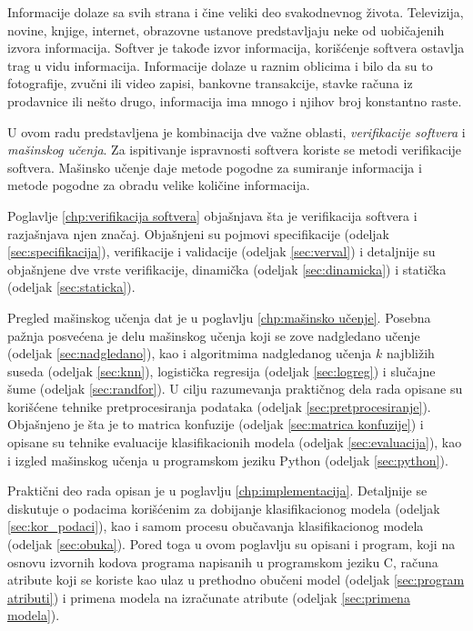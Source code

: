 \documentclass[12pt,oneside]{memoir}
\begin{document}
Informacije dolaze sa svih strana i čine veliki deo svakodnevnog života. Televizija, novine, knjige, internet, obrazovne ustanove predstavljaju neke od uobičajenih izvora informacija. Softver je takođe izvor informacija, korišćenje softvera ostavlja trag u vidu informacija. Informacije dolaze u raznim oblicima i bilo da su to fotografije, zvučni ili video zapisi, bankovne transakcije, stavke računa iz prodavnice ili nešto drugo, informacija ima mnogo i njihov broj konstantno raste. 

U ovom radu predstavljena je kombinacija dve važne oblasti, \textit{verifikacije softvera} i \textit{mašinskog učenja}. Za ispitivanje ispravnosti softvera koriste se metodi verifikacije softvera. Mašinsko učenje daje metode pogodne za sumiranje informacija i metode pogodne za obradu velike količine informacija. 

Poglavlje \ref{chp:verifikacija softvera} objašnjava šta je verifikacija softvera i razjašnjava njen značaj. Objašnjeni su pojmovi specifikacije (odeljak \ref{sec:specifikacija}), verifikacije i validacije (odeljak \ref{sec:verval}) i detaljnije su objašnjene dve vrste verifikacije, dinamička (odeljak \ref{sec:dinamicka}) i statička (odeljak \ref{sec:staticka}). 

Pregled mašinskog učenja dat je u poglavlju \ref{chp:mašinsko učenje}. Posebna pažnja posvećena je delu mašinskog učenja koji se zove nadgledano učenje (odeljak \ref{sec:nadgledano}), kao i algoritmima nadgledanog učenja $k$ najbližih suseda (odeljak \ref{sec:knn}), logistička regresija (odeljak \ref{sec:logreg}) i slučajne šume (odeljak \ref{sec:randfor}). U cilju razumevanja praktičnog dela rada opisane su korišćene tehnike pretprocesiranja podataka (odeljak \ref{sec:pretprocesiranje}). Objašnjeno je šta je to matrica konfuzije (odeljak \ref{sec:matrica konfuzije}) i opisane su tehnike evaluacije klasifikacionih modela (odeljak \ref{sec:evaluacija}), kao i izgled mašinskog učenja u programskom jeziku Python (odeljak \ref{sec:python}). 

Praktični deo rada opisan je u poglavlju \ref{chp:implementacija}. Detaljnije se diskutuje o podacima korišćenim za dobijanje klasifikacionog modela (odeljak \ref{sec:kor_podaci}), kao i samom procesu obučavanja klasifikacionog modela (odeljak \ref{sec:obuka}). Pored toga u ovom poglavlju su opisani i program, koji na osnovu izvornih kodova programa napisanih u programskom jeziku C, računa atribute koji se koriste kao ulaz u prethodno obučeni model (odeljak \ref{sec:program atributi}) i primena modela na izračunate atribute (odeljak \ref{sec:primena modela}).  
\end{document}

